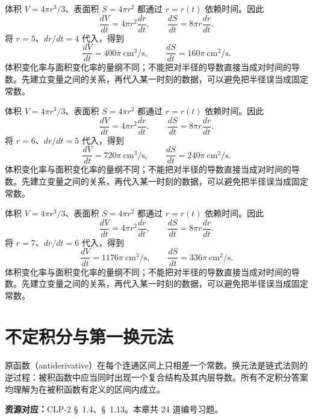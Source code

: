 \documentclass[12pt,fontset=fandol]{ctexart}
\begin{document}
\begin{solve}\label{ans:c11q23}
体积 $V=4\pi r^3/3$、表面积 $S=4\pi r^2$ 都通过 $r=r(t)$ 依赖时间。因此
\[
\frac{dV}{dt}=4\pi r^2\frac{dr}{dt},\qquad\frac{dS}{dt}=8\pi r\frac{dr}{dt}.
\]
将 $r=5$、$dr/dt=4$ 代入，得到
\[
\frac{dV}{dt}=400\pi\ \mathrm{cm}^3/\mathrm{s},\qquad\frac{dS}{dt}=160\pi\ \mathrm{cm}^2/\mathrm{s}.
\]
体积变化率与面积变化率的量纲不同；不能把对半径的导数直接当成对时间的导数。先建立变量之间的关系，再代入某一时刻的数据，可以避免把半径误当成固定常数。
\end{solve}

\begin{solve}\label{ans:c11q24}
体积 $V=4\pi r^3/3$、表面积 $S=4\pi r^2$ 都通过 $r=r(t)$ 依赖时间。因此
\[
\frac{dV}{dt}=4\pi r^2\frac{dr}{dt},\qquad\frac{dS}{dt}=8\pi r\frac{dr}{dt}.
\]
将 $r=6$、$dr/dt=5$ 代入，得到
\[
\frac{dV}{dt}=720\pi\ \mathrm{cm}^3/\mathrm{s},\qquad\frac{dS}{dt}=240\pi\ \mathrm{cm}^2/\mathrm{s}.
\]
体积变化率与面积变化率的量纲不同；不能把对半径的导数直接当成对时间的导数。先建立变量之间的关系，再代入某一时刻的数据，可以避免把半径误当成固定常数。
\end{solve}

\begin{solve}\label{ans:c11q25}
体积 $V=4\pi r^3/3$、表面积 $S=4\pi r^2$ 都通过 $r=r(t)$ 依赖时间。因此
\[
\frac{dV}{dt}=4\pi r^2\frac{dr}{dt},\qquad\frac{dS}{dt}=8\pi r\frac{dr}{dt}.
\]
将 $r=7$、$dr/dt=6$ 代入，得到
\[
\frac{dV}{dt}=1176\pi\ \mathrm{cm}^3/\mathrm{s},\qquad\frac{dS}{dt}=336\pi\ \mathrm{cm}^2/\mathrm{s}.
\]
体积变化率与面积变化率的量纲不同；不能把对半径的导数直接当成对时间的导数。先建立变量之间的关系，再代入某一时刻的数据，可以避免把半径误当成固定常数。
\end{solve}

\clearpage
\section{不定积分与第一换元法}\label{sec:ch12}
原函数（antiderivative）在每个连通区间上只相差一个常数。换元法是链式法则的逆过程：被积函数中应当同时出现一个复合结构及其内层导数。所有不定积分答案均理解为在被积函数有定义的区间内成立。

\textbf{资源对应：}CLP-2 \S~1.4、\S~1.13。本章共 24 道编号习题。
\end{document}
